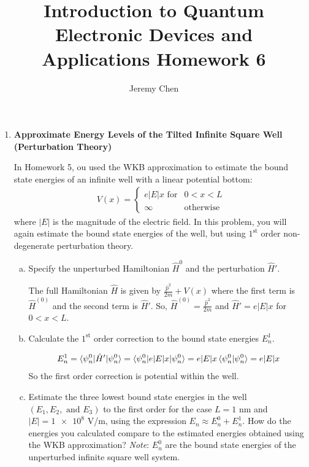 \documentclass[10pt,letterpaper]{article}
\title{Introduction to Quantum Electronic Devices and Applications Homework 6}
\author{Jeremy Chen}
\begin{document}
	\maketitle

\begin{enumerate}

\item \textbf{Approximate Energy Levels of the Tilted Infinite Square Well (Perturbation Theory)}

In Homework 5, ou used the WKB approximation to estimate the bound state energies of an infinite well with a linear potential bottom:
\begin{gather*}
V(x) = \begin{cases}
e|E|x \text{\ \ \ for} & 0 < x < L \\
\infty & \text{otherwise}
\end{cases}
\end{gather*}
where $|E|$ is the magnitude of the electric field. In this problem, you will again estimate the bound state energies of the well, but using $1^{\text{st}}$ order non-degenerate perturbation theory.

\begin{enumerate}[a)]

\item Specify the unperturbed Hamiltonian $\hat{H}^{0}$ and the perturbation $\hat{H}'$.

\color{violet}
The full Hamiltonian $\hat{H}$ is given by $\frac{\hat{p}^{2}}{2m} + V(x)$ where the first term is $\hat{H}^{(0)}$ and the second term is $\hat{H}'$. So, $\hat{H}^{(0)} = \frac{\hat{p}^{2}}{2m}$ and $\hat{H}' = e|E|x$ for $0 < x < L$. 
\color{black}

\item Calculate the $1^{\text{st}}$ order correction to the bound state energies $E_{n}^{1}$. 

\color{violet}
\begin{gather*}
E_{n}^{1} = \braket{\psi_{n}^{0} | \hat{H}' | \psi_{n}^{0}} = \braket{\psi_{n}^{0} | e|E|x | \psi_{n}^{0}} = e|E|x \braket{\psi_{n}^{0} | \psi_{n}^{0}} = e|E|x
\end{gather*}
So the first order correction is potential within the well. 
\color{black}

\item Estimate the three lowest bound state energies in the well $(E_{1}, E_{2}, \text{ and } E_{3})$ to the first order for the case $L = 1$ nm and $|E| = \num{1e8}$ V/m, using the expression $E_{n} \approx E_{n}^{0} + E_{n}^{1}$. How do the energies you calculated compare to the estimated energies obtained using the WKB approximation? \textit{Note}: $E_{n}^{0}$ are the bound state energies of the unperturbed infinite square well system. 


\end{enumerate}
\end{enumerate}
\end{document}
